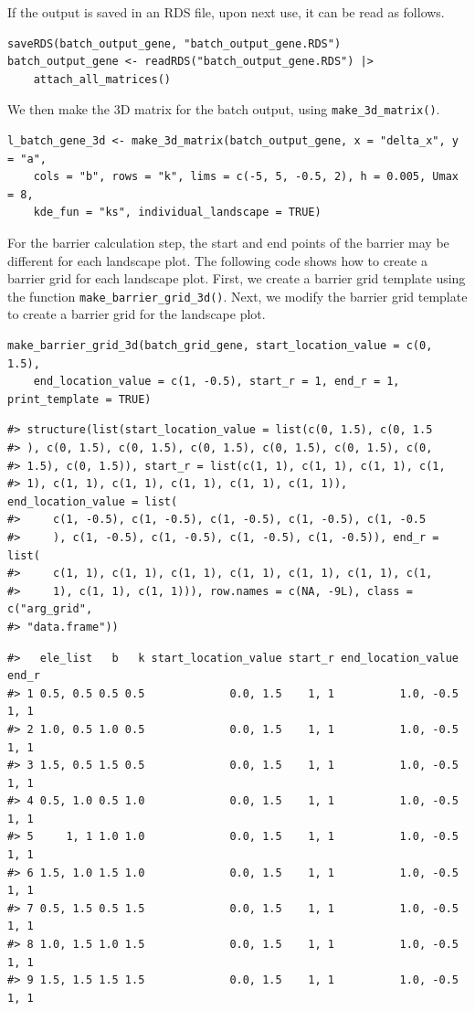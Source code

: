 If the output is saved in an RDS file, upon next use, it can be read as follows.

\begin{verbatim}
saveRDS(batch_output_gene, "batch_output_gene.RDS")
batch_output_gene <- readRDS("batch_output_gene.RDS") |>
    attach_all_matrices()
\end{verbatim}

We then make the 3D matrix for the batch output, using \texttt{make\_3d\_matrix()}.

\begin{verbatim}
l_batch_gene_3d <- make_3d_matrix(batch_output_gene, x = "delta_x", y = "a",
    cols = "b", rows = "k", lims = c(-5, 5, -0.5, 2), h = 0.005, Umax = 8,
    kde_fun = "ks", individual_landscape = TRUE)
\end{verbatim}

For the barrier calculation step, the start and end points of the barrier may be different for each landscape plot. The following code shows how to create a barrier grid for each landscape plot. First, we create a barrier grid template using the function \texttt{make\_barrier\_grid\_3d()}. Next, we modify the barrier grid template to create a barrier grid for the landscape plot.

\begin{verbatim}
make_barrier_grid_3d(batch_grid_gene, start_location_value = c(0, 1.5),
    end_location_value = c(1, -0.5), start_r = 1, end_r = 1, print_template = TRUE)
\end{verbatim}

\begin{verbatim}
#> structure(list(start_location_value = list(c(0, 1.5), c(0, 1.5
#> ), c(0, 1.5), c(0, 1.5), c(0, 1.5), c(0, 1.5), c(0, 1.5), c(0, 
#> 1.5), c(0, 1.5)), start_r = list(c(1, 1), c(1, 1), c(1, 1), c(1, 
#> 1), c(1, 1), c(1, 1), c(1, 1), c(1, 1), c(1, 1)), end_location_value = list(
#>     c(1, -0.5), c(1, -0.5), c(1, -0.5), c(1, -0.5), c(1, -0.5
#>     ), c(1, -0.5), c(1, -0.5), c(1, -0.5), c(1, -0.5)), end_r = list(
#>     c(1, 1), c(1, 1), c(1, 1), c(1, 1), c(1, 1), c(1, 1), c(1, 
#>     1), c(1, 1), c(1, 1))), row.names = c(NA, -9L), class = c("arg_grid", 
#> "data.frame"))
\end{verbatim}

\begin{verbatim}
#>   ele_list   b   k start_location_value start_r end_location_value end_r
#> 1 0.5, 0.5 0.5 0.5             0.0, 1.5    1, 1          1.0, -0.5  1, 1
#> 2 1.0, 0.5 1.0 0.5             0.0, 1.5    1, 1          1.0, -0.5  1, 1
#> 3 1.5, 0.5 1.5 0.5             0.0, 1.5    1, 1          1.0, -0.5  1, 1
#> 4 0.5, 1.0 0.5 1.0             0.0, 1.5    1, 1          1.0, -0.5  1, 1
#> 5     1, 1 1.0 1.0             0.0, 1.5    1, 1          1.0, -0.5  1, 1
#> 6 1.5, 1.0 1.5 1.0             0.0, 1.5    1, 1          1.0, -0.5  1, 1
#> 7 0.5, 1.5 0.5 1.5             0.0, 1.5    1, 1          1.0, -0.5  1, 1
#> 8 1.0, 1.5 1.0 1.5             0.0, 1.5    1, 1          1.0, -0.5  1, 1
#> 9 1.5, 1.5 1.5 1.5             0.0, 1.5    1, 1          1.0, -0.5  1, 1
\end{verbatim}

